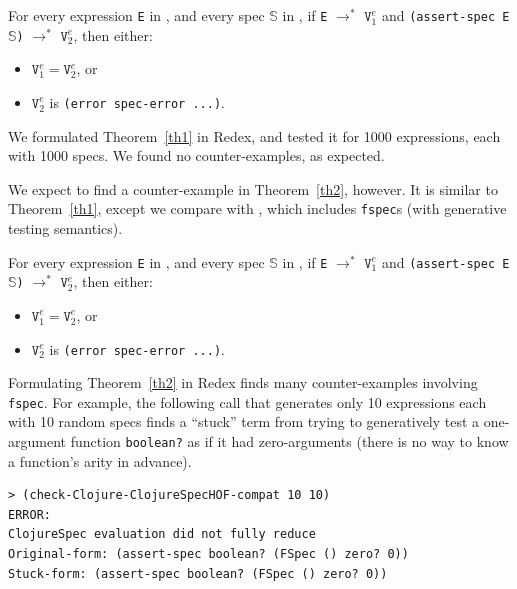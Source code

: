 \begin{theorem}
\label{th1}
For every expression \texttt{E} in \lambdac{}, 
and every spec $\mathbb{S}$ in \lambdacs{}, 
if \texttt{E} $\rightarrow^{*}$ $\texttt{V}_1^{e}$ and
\texttt{(assert-spec E $\mathbb{S}$)} $\rightarrow^{*}$ $\texttt{V}_2^{e}$,
then either:
\begin{itemize}
\item $\texttt{V}_1^{e} = \texttt{V}_2^{e}$, or
\item $\texttt{V}_2^{e}$ is \texttt{(error spec-error ...)}.
\end{itemize}
\end{theorem}

We formulated Theorem~\ref{th1} in Redex, and tested it for 1000 expressions,
each with 1000 specs. We found no counter-examples, as expected.

We expect to find a counter-example in Theorem~\ref{th2}, however.
It is similar to Theorem~\ref{th1}, except we compare \lambdac{} with
\lambdacs{}, which includes \texttt{fspec}s (with generative testing semantics).

\begin{theorem}
\label{th2}
For every expression \texttt{E} in \lambdac{}, 
and every spec $\mathbb{S}$ in \lambdacsf{}, 
if \texttt{E} $\rightarrow^{*}$ $\texttt{V}_1^{e}$ and
\texttt{(assert-spec E $\mathbb{S}$)} $\rightarrow^{*}$ $\texttt{V}_2^{e}$,
then either:
\begin{itemize}
\item $\texttt{V}_1^{e} = \texttt{V}_2^{e}$, or
\item $\texttt{V}_2^{e}$ is \texttt{(error spec-error ...)}.
\end{itemize}
\end{theorem}

Formulating Theorem~\ref{th2} in Redex finds many counter-examples
involving \texttt{fspec}.
For example, the following call that generates only 10 expressions each with 10
random specs finds a ``stuck'' term from trying to generatively test a one-argument
function \texttt{boolean?} as if it had zero-arguments (there is no way to know
a function's arity in advance).

\begin{verbatim}
> (check-Clojure-ClojureSpecHOF-compat 10 10)
ERROR:
ClojureSpec evaluation did not fully reduce
Original-form: (assert-spec boolean? (FSpec () zero? 0))
Stuck-form: (assert-spec boolean? (FSpec () zero? 0))
\end{verbatim}

